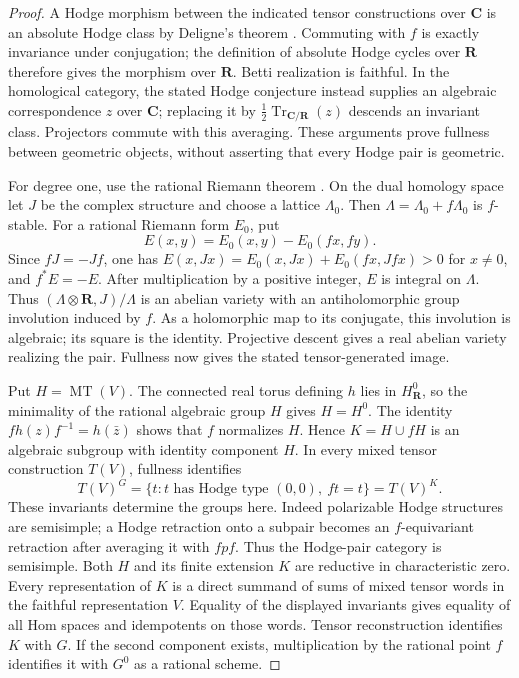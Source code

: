 \documentclass[11pt]{article}
\theoremstyle{definition}\newtheorem{definition}[theorem]{Definition}
\theoremstyle{remark}\newtheorem{remark}[theorem]{Remark}
\newcommand{\R}{\mathbf R}\newcommand{\C}{\mathbf C}
\begin{document}
\begin{proof}
A Hodge morphism between the indicated tensor constructions over $\C$ is an absolute Hodge class by Deligne's theorem \cite[Theorem~2.11, author p.~19]{DeligneHodgeCycles}. Commuting with $f$ is exactly invariance under conjugation; the definition of absolute Hodge cycles over $\R$ therefore gives the morphism over $\R$. Betti realization is faithful. In the homological category, the stated Hodge conjecture instead supplies an algebraic correspondence $z$ over $\C$; replacing it by $\tfrac12\operatorname{Tr}_{\C/\R}(z)$ descends an invariant class. Projectors commute with this averaging. These arguments prove fullness between geometric objects, without asserting that every Hodge pair is geometric.

For degree one, use the rational Riemann theorem \cite[Theorem~6.20 and Proposition~6.21, p.~65]{DeligneMilne}. On the dual homology space let $J$ be the complex structure and choose a lattice $\Lambda_0$. Then $\Lambda=\Lambda_0+f\Lambda_0$ is $f$-stable. For a rational Riemann form $E_0$, put
\[
                E(x,y)=E_0(x,y)-E_0(fx,fy).
\]
Since $fJ=-Jf$, one has
$E(x,Jx)=E_0(x,Jx)+E_0(fx,Jfx)>0$ for $x\ne0$, and $f^*E=-E$. After multiplication by a positive integer, $E$ is integral on $\Lambda$. Thus $(\Lambda\otimes\R,J)/\Lambda$ is an abelian variety with an antiholomorphic group involution induced by $f$. As a holomorphic map to its conjugate, this involution is algebraic; its square is the identity. Projective descent gives a real abelian variety realizing the pair. Fullness now gives the stated tensor-generated image.

Put $H=\operatorname{MT}(V)$. The connected real torus defining $h$ lies in $H^0_{\R}$, so the minimality of the rational algebraic group $H$ gives $H=H^0$. The identity $fh(z)f^{-1}=h(\bar z)$ shows that $f$ normalizes $H$. Hence $K=H\cup fH$ is an algebraic subgroup with identity component $H$. In every mixed tensor construction $T(V)$, fullness identifies
\[
 T(V)^G=\{t:t\text{ has Hodge type }(0,0),\ ft=t\}=T(V)^K.
\]
These invariants determine the groups here. Indeed polarizable Hodge structures are semisimple; a Hodge retraction onto a subpair becomes an $f$-equivariant retraction after averaging it with $fpf$. Thus the Hodge-pair category is semisimple. Both $H$ and its finite extension $K$ are reductive in characteristic zero. Every representation of $K$ is a direct summand of sums of mixed tensor words in the faithful representation $V$. Equality of the displayed invariants gives equality of all Hom spaces and idempotents on those words. Tensor reconstruction \cite[Theorem~2.11]{DeligneMilne} identifies $K$ with $G$. If the second component exists, multiplication by the rational point $f$ identifies it with $G^0$ as a rational scheme.
\end{proof}
\end{document}
